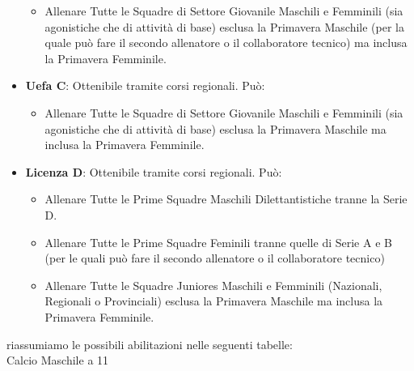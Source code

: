 \documentclass[../uefaC.tex]{subfiles}
\begin{document}
\begin{itemize}
\begin{itemize}
            \item Allenare Tutte le Squadre di Settore Giovanile Maschili e Femminili (sia agonistiche che di attività di base) esclusa la Primavera Maschile (per la quale può fare il secondo allenatore o il collaboratore tecnico) ma inclusa la Primavera Femminile.
        \end{itemize}
    \item\textbf{Uefa C}: Ottenibile tramite corsi regionali. Può:
        \begin{itemize}
            \item Allenare Tutte le Squadre di Settore Giovanile Maschili e Femminili (sia agonistiche che di attività di base) esclusa la Primavera Maschile ma inclusa la Primavera Femminile.
        \end{itemize}
    \item\textbf{Licenza D}:  Ottenibile tramite corsi regionali. Può:
        \begin{itemize}
            \item Allenare Tutte le Prime Squadre Maschili Dilettantistiche tranne la Serie D.
            \item Allenare Tutte le Prime Squadre Feminili tranne quelle di Serie A e B (per le quali può fare il secondo allenatore o il collaboratore tecnico)
            \item Allenare Tutte le Squadre Juniores Maschili e Femminili (Nazionali, Regionali o Provinciali) esclusa la Primavera Maschile ma inclusa la Primavera Femminile.
        \end{itemize}
\end{itemize}
riassumiamo le possibili abilitazioni nelle seguenti tabelle: \hfill \\

Calcio Maschile a 11  \hfill \\
\end{document}
